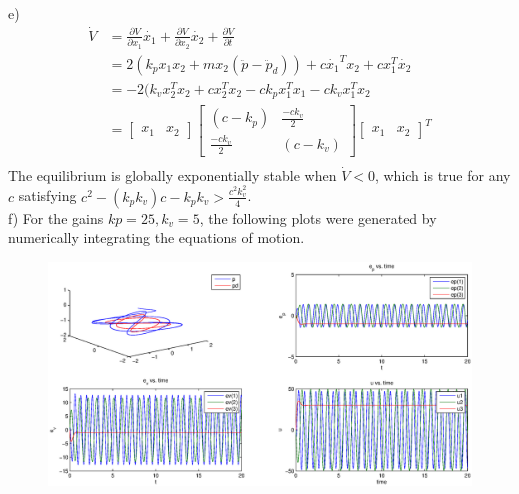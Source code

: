 \documentclass[paper=a4, fontsize=11pt]{scrartcl} %
\numberwithin{equation}{section} %
\numberwithin{figure}{section} %
\numberwithin{table}{section} %
\begin{document}
e) \begin{align}
\dot{V} &= \frac{\partial V}{\partial x_1}\dot{x_1} + \frac{\partial V}{\partial x_2}\dot{x_2} +\frac{\partial V}{\partial t}\\
&=2(k_px_1x_2 + mx_2(\ddot{p}-\ddot{p}_d))+c\dot{x_1}^Tx_2+cx_1^T\dot{x_2} \\
&= -2(k_vx_2^Tx_2 + cx_2^Tx_2-ck_px_1^Tx_1-ck_vx_1^Tx_2 \\
&= \begin{bmatrix}x_1 & x_2\end{bmatrix} \begin{bmatrix}(c-k_p) & \frac{-ck_v}{2}\\ \frac{-ck_v}{2} & (c-k_v)\end{bmatrix} \begin{bmatrix}x_1 & x_2\end{bmatrix}^T \\
\end{align}
The equilibrium is globally exponentially stable when $\dot{V}<0$, which is true for any $c$ satisfying $c^2-(k_pk_v)c-k_pk_v> \frac{c^2k_v^2}{4}$. \\

f) For the gains $kp=25, k_v=5$, the following plots were generated by numerically integrating the equations of motion.
\begin{figure}[h!]
\centering
\includegraphics[scale=0.5]{prob5f}
\end{figure} 


\newpage
\end{document}
